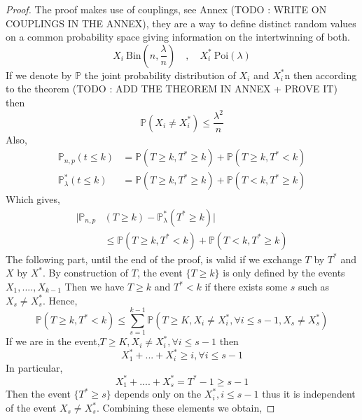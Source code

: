 \begin{proof}
	The proof makes use of couplings, see Annex (TODO : WRITE ON COUPLINGS IN THE ANNEX), they are a way to define distinct random values on a common probability space giving information on the intertwinning of both.
	\begin{equation}
		X_i~\text{Bin}(n, \frac{\lambda}{n})\quad,\quad X_i^* ~\text{Poi}(\lambda)
	\end{equation}
	If we denote by $\mathbb{P}$ the joint probability distribution of $X_i$ and $X_i^*$n then according to the theorem (TODO : ADD THE THEOREM IN ANNEX + PROVE IT) then
	\begin{equation}
		\mathbb{P}(X_i \neq X_i^*) \leq \frac{\lambda^2}{n}
	\end{equation}
	Also, 
	\begin{align}
		\mathbb{P}_{n,p}(t\leq k) &= \mathbb{P}(T\geq k, T^* \geq k) +\mathbb{P}(T\geq k, T^* < k)\\
		\mathbb{P}_{\lambda}^*(t\leq k) &= \mathbb{P}(T\geq k, T^* \geq k) +\mathbb{P}(T< k, T^* \geq k)
	\end{align}
	Which gives,
	\begin{align}
		|\mathbb{P}_{n, p}&(T \geq k) -\mathbb{P}_{\lambda}^*(T^* \geq k)|\\
				  &\leq  \mathbb{P}(T\geq k, T^* < k) +\mathbb{P}(T< k, T^* \geq k)
	\end{align}
	The following part, until the end of the proof, is valid if we exchange $T$ by $T^*$ and $X$ by $X^*$.
	\newline
	By construction of $T$, the event $\{T\geq k\}$ is only defined by the events $X_1, ...., X_{k-1}$
	Then we have $T\geq k$ and $T^*<k$ if there exists some $s$ such as $X_s \neq X_s^*$.
	Hence, 
	\begin{equation}
		\mathbb{P}(T\geq k, T^*<k) \leq \sum_{s=1}^{k-1}\mathbb{P}(T \geq K, X_i \neq X_i^*, \forall i \leq s-1, X_s \neq X_s^*)
	\end{equation}
	If we are in the event,$T \geq K, X_i \neq X_i^*, \forall i \leq s-1$ then
	\begin{equation}
		X_1^*+...+X_i^* \geq i, \forall i \leq s-1
	\end{equation}
	In particular,
	\begin{equation}
		X_1^*+....+X_s^* = T^* - 1 \geq s-1
	\end{equation}
	Then the event $\{T^* \geq s\}$ depends only on the $X_i^*, i\leq s-1$ thus it is independent of the event $X_s \neq X_s^*$.
	Combining these elements we obtain,

\end{proof}
